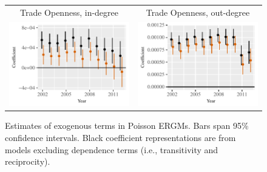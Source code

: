 \documentclass[reqno,onecolumn,letterpaper,12pt]{article}
\begin{document}
\begin{figure}[htp]
\begin{tabular}{c@{\hskip -.4cm}c}
Trade Openness, in-degree &
Trade Openness,  out-degree\\
\includegraphics[height=.2\textheight, clip=true, trim=0cm .5cm 0cm .1cm]{draft_figures/rl_plots/TradeO_in.pdf}  &
\includegraphics[height=.2\textheight, clip=true, trim=.5cm .5cm 0cm .1cm]{draft_figures/rl_plots/TradeO_out.pdf}   \\
\end{tabular}
\caption{\label{fig:effectPlots2} Estimates of exogenous terms in Poisson ERGMs. Bars span 95\% confidence intervals. Black coefficient representations are from models excluding dependence terms (i.e., transitivity and reciprocity).}
\end{figure}
\end{document}
